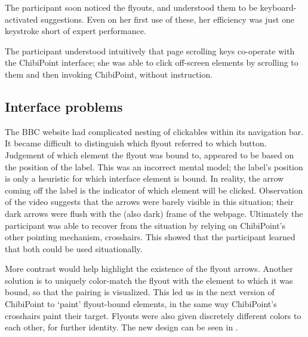 \documentclass[11pt,openright,a4paper]{report}
\begin{document}
The participant soon noticed the flyouts, and understood them to be keyboard-activated suggestions. Even on her first use of these, her efficiency was just one keystroke short of expert performance.

The participant understood intuitively that page scrolling keys co-operate with the ChibiPoint interface; she was able to click off-screen elements by scrolling to them and then invoking ChibiPoint, without instruction.

\subsection{Interface problems}
The BBC website had complicated nesting of clickables within its navigation bar. It became difficult to distinguish which flyout referred to which button. Judgement of which element the flyout was bound to, appeared to be based on the position of the label. This was an incorrect mental model; the label's position is only a heuristic for which interface element is bound. In reality, the arrow coming off the label is the indicator of which element will be clicked. Observation of the video suggests that the arrows were barely visible in this situation; their dark arrows were flush with the (also dark) frame of the webpage. Ultimately the participant was able to recover from the situation by relying on ChibiPoint's other pointing mechanism, crosshairs. This showed that the participant learned that both could be used situationally.

More contrast would help highlight the existence of the flyout arrows. Another solution is to uniquely color-match the flyout with the element to which it was bound, so that the pairing is visualized. This led us in the next version of ChibiPoint to `paint' flyout-bound elements, in the same way ChibiPoint's crosshairs paint their target. Flyouts were also given discretely different colors to each other, for further identity. The new design can be seen in .
\end{document}
